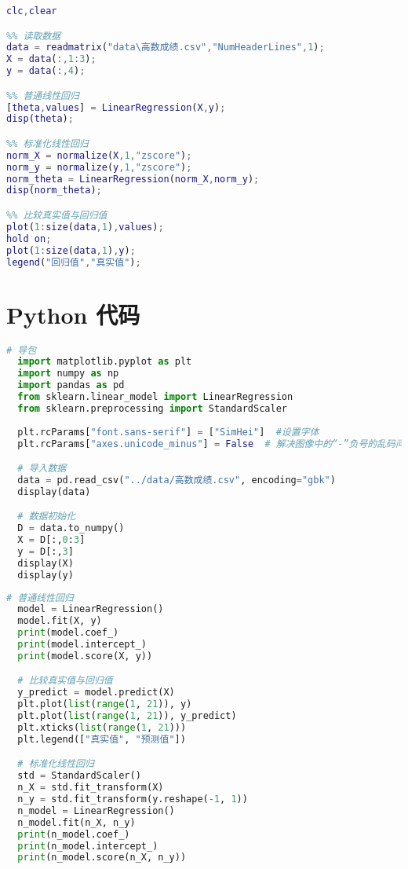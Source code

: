 \documentclass[withoutpreface]{cumcmthesis}
\begin{document}
  \begin{lstlisting}[language=matlab ,caption={线性回归简单示例} ]
clc,clear

%% 读取数据
data = readmatrix("data\高数成绩.csv","NumHeaderLines",1);
X = data(:,1:3);
y = data(:,4);

%% 普通线性回归
[theta,values] = LinearRegression(X,y);
disp(theta);

%% 标准化线性回归
norm_X = normalize(X,1,"zscore");
norm_y = normalize(y,1,"zscore");
norm_theta = LinearRegression(norm_X,norm_y);
disp(norm_theta);

%% 比较真实值与回归值
plot(1:size(data,1),values);
hold on;
plot(1:size(data,1),y);
legend("回归值","真实值");
  \end{lstlisting}


\section{Python 代码}

  \begin{lstlisting}[language=python ,caption=初始化 ]
  # 导包
  import matplotlib.pyplot as plt
  import numpy as np
  import pandas as pd
  from sklearn.linear_model import LinearRegression
  from sklearn.preprocessing import StandardScaler
  
  plt.rcParams["font.sans-serif"] = ["SimHei"]  #设置字体
  plt.rcParams["axes.unicode_minus"] = False  # 解决图像中的“-”负号的乱码问题

  # 导入数据
  data = pd.read_csv("../data/高数成绩.csv", encoding="gbk")
  display(data)

  # 数据初始化
  D = data.to_numpy()
  X = D[:,0:3]
  y = D[:,3]
  display(X)
  display(y)
  \end{lstlisting}


  \begin{lstlisting}[language=python ,caption={线性回归简单示例} ]
  # 普通线性回归
  model = LinearRegression()
  model.fit(X, y)
  print(model.coef_)
  print(model.intercept_)
  print(model.score(X, y))

  # 比较真实值与回归值
  y_predict = model.predict(X)
  plt.plot(list(range(1, 21)), y)
  plt.plot(list(range(1, 21)), y_predict)
  plt.xticks(list(range(1, 21)))
  plt.legend(["真实值", "预测值"])

  # 标准化线性回归
  std = StandardScaler()
  n_X = std.fit_transform(X)
  n_y = std.fit_transform(y.reshape(-1, 1))
  n_model = LinearRegression()
  n_model.fit(n_X, n_y)
  print(n_model.coef_)
  print(n_model.intercept_)
  print(n_model.score(n_X, n_y))
  \end{lstlisting}
\end{document}
